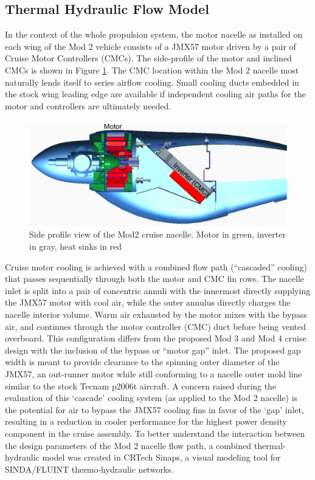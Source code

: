 \documentclass[]{aiaa-tc}%
\begin{document}
\pagebreak
\subsection{Thermal Hydraulic Flow Model}

In the context of the whole propulsion system, the motor nacelle as installed on each wing of the Mod 2 vehicle consists of a JMX57 motor driven by a pair of Cruise Motor Controllers (CMCs). The side-profile of the motor and inclined CMCs is shown in Figure \ref{fig:Mod2Profile}. The CMC location within the Mod 2 nacelle most naturally lends itself to series airflow cooling. Small cooling ducts embedded in the stock wing leading edge are available if independent cooling air paths for the motor and controllers are ultimately needed.  

\begin{figure}[!h]%
	\centering
	\includegraphics[width=1.0\textwidth]{figures/mod2_profilev2.png}
	\caption{Side profile view of the Mod2 cruise nacelle. Motor in green, inverter in gray, heat sinks in red}
	\label{fig:Mod2Profile}
\end{figure}

Cruise motor cooling is achieved with a combined flow path (“cascaded” cooling) that passes sequentially through both the motor and CMC fin rows.  The nacelle inlet is split into a pair of concentric annuli with the innermost directly supplying the JMX57 motor with cool air, while the outer annulus directly charges the nacelle interior volume.  Warm air exhausted by the motor mixes with the bypass air, and continues through the motor controller (CMC) duct before being vented overboard.  
This configuration differs from the proposed Mod 3 and Mod 4 cruise design with the inclusion of the bypass or “motor gap” inlet.  The proposed gap width is meant to provide clearance to the spinning outer diameter of the JMX57, an out-runner motor while still conforming to a nacelle outer mold line similar to the stock Tecnam p2006t aircraft. 
A concern raised during the evaluation of this ‘cascade’ cooling system (as applied to the Mod 2 nacelle) is the potential for air to bypass the JMX57 cooling fins in favor of the `gap' inlet, resulting in a reduction in cooler performance for the highest power density component in the cruise assembly.  
To better understand the interaction between the design parameters of the Mod 2 nacelle flow path, a combined thermal-hydraulic model was created in CRTech Sinaps, a visual modeling tool for SINDA/FLUINT thermo-hydraulic networks. 
\end{document}
